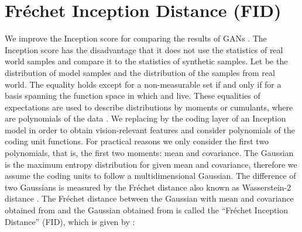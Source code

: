 \documentclass{article}
\begin{document}
\tableofcontents

\section{Fr\'{e}chet Inception Distance (FID)}
\label{sec:fid}

We improve the Inception score for comparing the results of GANs
\cite{Salimans:16}.
The Inception score has the disadvantage that it does not use
the statistics of real world samples and compare it to
the statistics of synthetic samples.
Let  be the distribution of model samples and  the
distribution of the samples from real world.
The equality  holds except for a non-measurable set
if and only if  for
a basis  spanning the function space in which  and 
live.
These equalities of expectations are used to describe distributions
by moments or cumulants, where  are polynomials of the data .
We replacing  by the coding layer of
an Inception model in order to obtain vision-relevant features and
consider polynomials of the coding unit functions.
For practical reasons we only consider the first two polynomials, that
is, the first two moments: mean and covariance.
The Gaussian is the maximum entropy distribution for given
mean and covariance, therefore we assume the coding units to follow a
multidimensional Gaussian.
The difference of two Gaussians is measured by the Fr\'{e}chet
distance \cite{Frechet:57}
also known as Wasserstein-2 distance \cite{Wasserstein:69}.
The Fr\'{e}chet distance
 between the Gaussian with mean and covariance  obtained
from  and the Gaussian  obtained
from  is called the ``Fr\'{e}chet Inception Distance'' (FID), which is
given by \cite{Dowson:82}:
\end{document}
